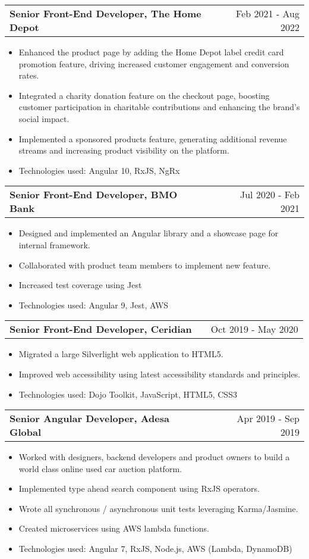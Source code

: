 \documentclass[a4paper,12pt]{article}
\makeatletter
\newenvironment{joblong}[2]
    {
    \begin{tabularx}{\linewidth}{@{}l X r@{}}
    \textbf{#1} & \hfill &  #2 \\[3.75pt]
    \end{tabularx}
    \begin{minipage}[t]{\linewidth}
    \begin{itemize}[nosep,after=\strut, leftmargin=1em, itemsep=3pt,label=--]
    }
    {
    \end{itemize}
    \end{minipage}    
    }
\makeatother
\begin{document}
\begin{joblong}{Senior Front-End Developer, The Home Depot}{Feb 2021 - Aug 2022}
\item Enhanced the product page by adding the Home Depot label credit card promotion feature, driving increased customer engagement and conversion rates.
\item Integrated a charity donation feature on the checkout page, boosting customer participation in charitable contributions and enhancing the brand's social impact. 
\item Implemented a sponsored products feature, generating additional revenue streams and increasing product visibility on the platform.
\item Technologies used:  Angular 10, RxJS, NgRx
\end{joblong}

\begin{joblong}{Senior Front-End Developer, BMO Bank}{Jul 2020 - Feb 2021}
\item Designed and implemented an Angular library and a showcase page for internal framework.
\item Collaborated with product team members to implement new feature.
\item Increased test coverage using Jest
\item Technologies used:  Angular 9, Jest, AWS
\end{joblong}

\begin{joblong}{Senior Front-End Developer, Ceridian}{Oct 2019 - May 2020}
\item Migrated a large Silverlight web application to HTML5.
\item Improved web accessibility using latest accessibility standards and principles. 
\item Technologies used:  Dojo Toolkit, JavaScript, HTML5, CSS3
\end{joblong}

\begin{joblong}{Senior Angular Developer, Adesa Global}{Apr 2019 - Sep 2019}
\item Worked with designers, backend developers and product owners to build a world class online used car auction platform.
\item Implemented type ahead search component using RxJS operators. 
\item Wrote all synchronous / asynchronous unit tests leveraging Karma/Jasmine.
\item Created microservices using AWS lambda functions.
\item Technologies used:  Angular 7, RxJS, Node.js, AWS (Lambda, DynamoDB)
\end{joblong}
\end{document}
